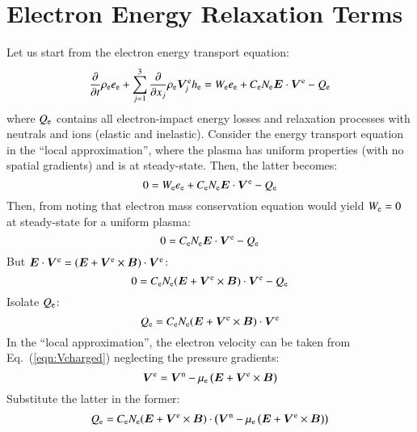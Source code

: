 \documentclass{warpdoc}
\renewcommand{\vec}[1]{\bm{#1}}
\begin{document}
\section{Electron Energy Relaxation Terms}



Let us start from the electron energy transport equation:
%
\begin{equation}
\frac{\partial }{\partial t}\rho_{\rm e} e_{\rm e} + \sum_{j=1}^3  \frac{\partial }{\partial x_j} \rho_{\rm e} \vec{V}^{\rm e}_j h_{\rm e} 
= 
 W_{\rm e} e_{\rm e}
+   C_{\rm e} N_{\rm e} \vec{E} \cdot \vec{V}^{\rm e}  
- Q_{\rm e}
\end{equation}
%
where $Q_{\rm e}$ contains all electron-impact energy losses and relaxation processes with neutrals and ions (elastic and inelastic). Consider the energy transport equation in the ``local approximation'', where the plasma has uniform properties (with no spatial gradients) and is at steady-state. Then, the latter becomes:
%
\begin{equation}
0
= 
 W_{\rm e} e_{\rm e}
+   C_{\rm e} N_{\rm e} \vec{E} \cdot \vec{V}^{\rm e}  
- Q_{\rm e}
\end{equation}
%
Then, from noting that electron mass conservation equation would yield $W_{\rm e}=0$ at steady-state for a uniform plasma:
%
\begin{equation}
0
= 
   C_{\rm e} N_{\rm e} \vec{E} \cdot \vec{V}^{\rm e}  
- Q_{\rm e}
\end{equation}
%
But $\vec{E} \cdot \vec{V}^{\rm e}=(\vec{E}+\vec{V}^{\rm e}\times\vec{B}) \cdot \vec{V}^{\rm e}$:
%
\begin{equation}
0
= 
   C_{\rm e} N_{\rm e} (\vec{E}+\vec{V}^{\rm e}\times\vec{B}) \cdot \vec{V}^{\rm e}  
- Q_{\rm e}
\end{equation}
%
Isolate $Q_{\rm e}$:
%
\begin{equation}
Q_{\rm e}
= 
   C_{\rm e} N_{\rm e} (\vec{E}+\vec{V}^{\rm e}\times\vec{B}) \cdot \vec{V}^{\rm e}  
\end{equation}
%
In the ``local approximation'',  the electron velocity can be taken from Eq.\ (\ref{eqn:Vcharged}) neglecting the pressure gradients:
%
\begin{equation}
  \vec{V}^{\rm e}=\vec{V}^{\rm n} - \mu_{\rm e} \left(\vec{E}+\vec{V}^{\rm e} \times \vec{B}\right)
\end{equation}
% 
Substitute the latter in the former:
%
\begin{equation}
Q_{\rm e}
= 
   C_{\rm e} N_{\rm e} (\vec{E}+\vec{V}^{\rm e}\times\vec{B}) \cdot \left( \vec{V}^{\rm n} - \mu_{\rm e} \left(\vec{E}+\vec{V}^{\rm e} \times \vec{B}\right) \right)
\end{equation}
%
\end{document}
